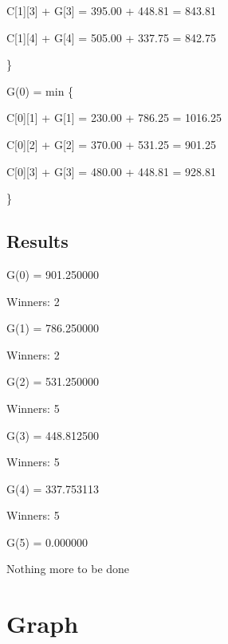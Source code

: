 \documentclass{article}
\begin{document}
\hspace{1cm} C[1][3] + G[3] = 395.00 + 448.81 = 843.81 

\hspace{1cm} C[1][4] + G[4] = 505.00 + 337.75 = 842.75 

 \} 


G(0) = min \{ 

\hspace{1cm} C[0][1] + G[1] = 230.00 + 786.25 = 1016.25 

\hspace{1cm} C[0][2] + G[2] = 370.00 + 531.25 = 901.25 

\hspace{1cm} C[0][3] + G[3] = 480.00 + 448.81 = 928.81 

 \} 


\subsection{Results}

\noindent G(0) = 901.250000 

\noindent Winners: 2 

\noindent G(1) = 786.250000 

\noindent Winners: 2 

\noindent G(2) = 531.250000 

\noindent Winners: 5 

\noindent G(3) = 448.812500 

\noindent Winners: 5 

\noindent G(4) = 337.753113 

\noindent Winners: 5 

\noindent G(5) = 0.000000 

\noindent Nothing more to be done
\section{Graph}
\begin{center}
\begin{adjustbox}{max width=\textwidth}
\end{adjustbox}


\end{center}
\end{document}
